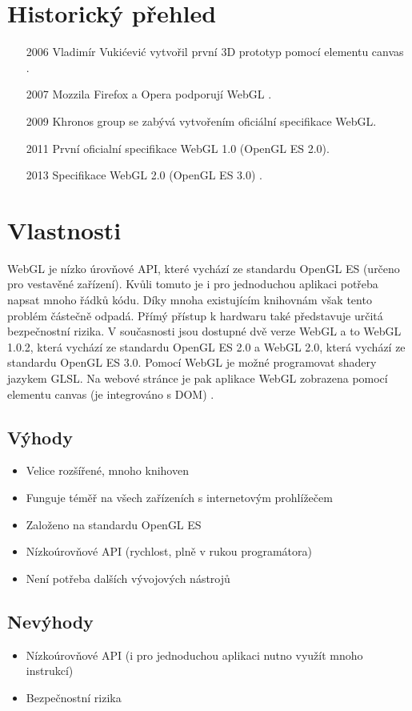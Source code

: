 \documentclass[12pt,a4paper,titlepage,final]{report}
\begin{document}
\section{Historický přehled}
\begin{itemize}
	\item[2006] Vladimír Vukićević vytvořil první 3D prototyp pomocí elementu canvas \cite{history}.
	\item[2007] Mozzila Firefox a Opera podporují WebGL \cite{history}.
	\item[2009] Khronos group se zabývá vytvořením oficiální specifikace WebGL.
	\item[2011] První oficialní specifikace WebGL 1.0 (OpenGL ES 2.0)\cite{history}.
	\item[2013] Specifikace WebGL 2.0 (OpenGL ES 3.0) \cite{history2}.
\end{itemize}

\section{Vlastnosti}
WebGL je nízko úrovňové API, které vychází ze standardu OpenGL ES (určeno pro vestavěné zařízení). Kvůli tomuto je i pro jednoduchou aplikaci potřeba napsat mnoho řádků kódu. Díky mnoha existujícím knihovnám však tento problém částečně odpadá. Přímý přístup k hardwaru také představuje určitá bezpečnostní rizika. V současnosti jsou dostupné dvě verze WebGL a to WebGL 1.0.2, která vychází ze standardu OpenGL ES 2.0 a WebGL 2.0, která vychází ze standardu OpenGL ES 3.0. Pomocí WebGL je možné programovat shadery jazykem GLSL. Na webové stránce je pak aplikace WebGL zobrazena pomocí elementu canvas (je integrováno s DOM) \cite{khronos}.

\subsection{Výhody}
\begin{itemize}
	\item Velice rozšířené, mnoho knihoven
	\item Funguje téměř na všech zařízeních s internetovým prohlížečem	
	\item Založeno na standardu OpenGL ES
  \item Nízkoúrovňové API (rychlost, plně v rukou programátora)
  \item Není potřeba dalších vývojových nástrojů
\end{itemize}
\subsection{Nevýhody}
\begin{itemize}
	\item Nízkoúrovňové API (i pro jednoduchou aplikaci nutno využít mnoho instrukcí)
	\item Bezpečnostní rizika	
\end{itemize}
\end{document}
